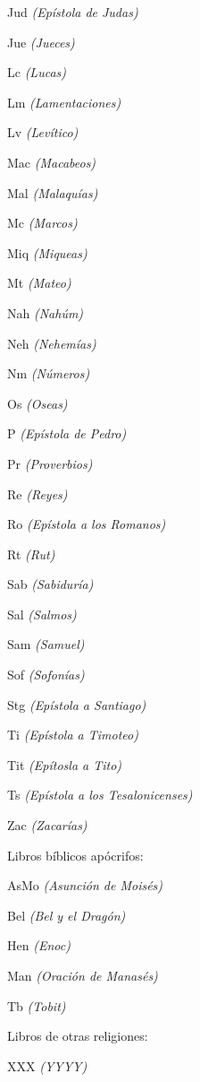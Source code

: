 \documentclass[twoside, 11pt]{book}
\begin{document}
\begin{multicols}{2}
	\par Jud \textit{(Epístola de Judas)}
	\par Jue \textit{(Jueces)}
	\par Lc \textit{(Lucas)}
	\par Lm \textit{(Lamentaciones)}
	\par Lv \textit{(Levítico)}
	\par Mac \textit{(Macabeos)}
	\par Mal \textit{(Malaquías)}
	\par Mc \textit{(Marcos)}
	\par Miq \textit{(Miqueas)} 
	\par Mt \textit{(Mateo)}
	\par Nah \textit{(Nahúm)}
	\par Neh \textit{(Nehemías)} 
	\par Nm \textit{(Números)}
	\par Os \textit{(Oseas)}
	\par P \textit{(Epístola de Pedro)}
	\par Pr \textit{(Proverbios)}
	\par Re \textit{(Reyes)}
	\par Ro \textit{(Epístola a los Romanos)}
	\par Rt \textit{(Rut)}
	\par Sab \textit{(Sabiduría)}
	\par Sal \textit{(Salmos)}
	\par Sam \textit{(Samuel)}
	\par Sof \textit{(Sofonías)}
	\par Stg \textit{(Epístola a Santiago)}
	\par Ti \textit{(Epístola a Timoteo)}
	\par Tit \textit{(Epítosla a Tito)}
	\par Ts \textit{(Epístola a los Tesalonicenses)}
	\par Zac \textit{(Zacarías)}
	\bigbreak
	\par Libros bíblicos apócrifos:
	\bigbreak 
	\par AsMo \textit{(Asunción de Moisés)}
	\par Bel \textit{(Bel y el Dragón)} 
	\par Hen \textit{(Enoc)} 
	\par Man \textit{(Oración de Manasés)} 
	\par Tb \textit{(Tobit)}
	\bigbreak
	\par Libros de otras religiones: 
	\bigbreak
	\par XXX \textit{(YYYY)}
	
	
\end{multicols}
\end{document}
